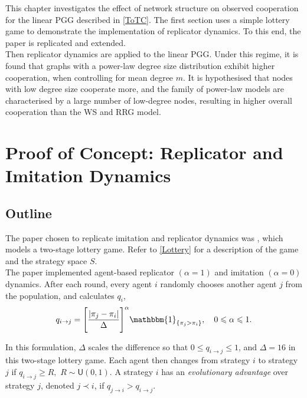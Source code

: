 This chapter investigates the effect of network structure on observed cooperation for the linear PGG described in \ref{ToTC}. The first section uses a simple lottery game to demonstrate the implementation of replicator dynamics. To this end, the paper \cite{RN30} is replicated and extended. \\

Then replicator dynamics are applied to the linear PGG. Under this regime, it is found that graphs with a power-law degree size distribution exhibit higher cooperation, when controlling for mean degree $m$. It is hypothesised that nodes with low degree size cooperate more, and the family of power-law models are characterised by a large number of low-degree nodes, resulting in higher overall cooperation than the WS and RRG model. \\
\section{Proof of Concept: Replicator and Imitation Dynamics} \label{Lottery_Me}
\subsection{Outline}
The paper chosen to replicate imitation and replicator dynamics was \cite{RN30}, which models a two-stage lottery game. Refer to \ref{Lottery} for a description of the game and the strategy space $S$. \\

The paper implemented agent-based replicator $(\alpha = 1)$ and imitation $(\alpha = 0)$ dynamics. After each round, every agent $i$ randomly chooses another agent $j$ from the population, and calculates $q_i$, \\

\begin{equation} \label{rep}
q_{i\to j} = \Bigg[ \frac{|\pi_j - \pi_i|}{\Delta} \Bigg]^\alpha \mathbbm{1}_{\{\pi_j>\pi_i\}}, \quad  0 \leq \alpha \leq 1.\end{equation} 

In this formulation, $\Delta$ scales the difference so that $0 \leq q_{i\to j} \leq 1$, and $\Delta = 16$ in this two-stage lottery game. Each agent then changes from strategy $i$ to strategy $j$ if $q_{i\to j} \geq R,$ $R  \sim \mathsf{U}(0,1)$. A strategy $i$ has an \emph{evolutionary advantage} over strategy $j$, denoted $j \prec i$, if $q_{j \to i} >q_{i \to j}$.    \\

